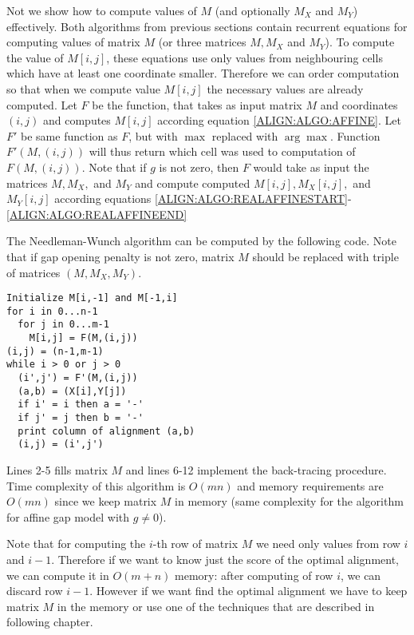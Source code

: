 Not we show how to compute  values of $M$ (and optionally $M_X$ and $M_Y$)
effectively.
Both algorithms from previous sections contain recurrent equations for computing
values of matrix $M$ (or three matrices $M,M_X$ and $M_Y$). To compute the
value of $M[i,j]$, these equations use only values
from neighbouring cells which have at least one coordinate smaller. 
Therefore we can order computation so that when we compute value $M[i,j]$ the
necessary values are already computed.
Let $F$ be
the function, that takes as input matrix $M$  and coordinates $(i,j)$ and computes $M[i,j]$ according equation
\ref{ALIGN:ALGO:AFFINE}.  Let $F'$ be
same function as $F$, but with $\max$ replaced with $\arg\max$.  Function
$F'(M,(i,j))$ will thus return which cell was used to computation of $F(M,(i,j))$.
Note that if $g$ is not zero, then $F$ would take as input the matrices $M,M_X,$
and $M_Y$ and compute computed $M[i,j],M_X[i,j],$ and $M_Y[i,j]$ according 
 equations
\ref{ALIGN:ALGO:REALAFFINESTART}-\ref{ALIGN:ALGO:REALAFFINEEND}

The Needleman-Wunch algorithm can be computed by the following code. Note that
if gap opening penalty is not zero, matrix $M$ should be replaced with triple of
matrices $(M,M_X,M_Y)$. 


\lstset{showstringspaces=false}
\begin{lstlisting}
Initialize M[i,-1] and M[-1,i]
for i in 0...n-1
  for j in 0...m-1
    M[i,j] = F(M,(i,j))
(i,j) = (n-1,m-1)
while i > 0 or j > 0
  (i',j') = F'(M,(i,j))
  (a,b) = (X[i],Y[j])
  if i' = i then a = '-'
  if j' = j then b = '-'
  print column of alignment (a,b)
  (i,j) = (i',j')
\end{lstlisting}

Lines 2-5 fills matrix $M$ and lines 6-12 implement the back-tracing procedure.
Time complexity of this algorithm is $O(mn)$ and memory requirements are $O(mn)$
since we keep matrix $M$ in memory (same complexity for the algorithm for
affine gap model with $g\not=0$).


Note that for computing the  $i$-th row of matrix $M$ we need only values from row
$i$ and $i-1$. Therefore if we want to know just the score of the optimal
alignment,
we can compute it in $O(m+n)$ memory: after computing of row $i$, we can discard
row $i-1$. However if we want find the optimal alignment we have to keep matrix
$M$ in the memory or use one of the techniques that are described in following
chapter.


